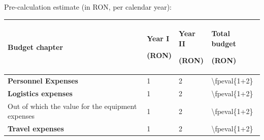 \documentclass[draftproposal,pncdib]{pncdi-pd}
\begin{document}
{
\setlength{\arrayrulewidth}{1pt}

\begin{pncdiexplanation}
Pre-calculation estimate (in RON, per calendar year):
\end{pncdiexplanation}

\edef\EuroRON{5.2429}

\edef\FirstYearPersonnel{1}
\edef\FirstYearLogistics{1}
\edef\FirstYearEquipment{1}
\edef\FirstYearTravel{1}
\edef\FirstYearIndirect{1}

\edef\SecondYearPersonnel{2}
\edef\SecondYearLogistics{2}
\edef\SecondYearEquipment{2}
\edef\SecondYearTravel{2}
\edef\SecondYearIndirect{2}

\edef\TotalPersonnel{\fpeval{\FirstYearPersonnel+\SecondYearPersonnel}}
\edef\TotalLogistics{\fpeval{\FirstYearLogistics+\SecondYearLogistics}}
\edef\TotalEquipment{\fpeval{\FirstYearEquipment+\SecondYearEquipment}}
\edef\TotalTravel{\fpeval{\FirstYearTravel+\SecondYearTravel}}
\edef\TotalIndirect{\fpeval{\FirstYearIndirect+\SecondYearIndirect}}

\noindent \begin{tabular}{
    |m{}
    |m{}
    |m{}
    |m{}|} \hline
\rowcolor{PNCDITableGray}
\centering\textbf{Budget chapter} &
\multicolumn{1}{m{0.1\textwidth}|}{\centering\textbf{Year I}

\textbf{(RON)}} &
\multicolumn{1}{m{0.1\textwidth}|}{\centering\textbf{Year II}

\textbf{(RON)}} &
\multicolumn{1}{m{0.185\textwidth}|}{\centering\textbf{Total budget}

\textbf{(RON)}}
\\\hline

\textbf{Personnel Expenses} &
\num{\FirstYearPersonnel} &
\num{\SecondYearPersonnel} &
\num{\TotalPersonnel}
\\\hline

\textbf{Logistics expenses} &
\num{\FirstYearLogistics} &
\num{\SecondYearLogistics} &
\num{\TotalLogistics}
\\\hline

Out of which the value for the equipment expenses &
\num{\FirstYearEquipment} &
\num{\SecondYearEquipment} &
\num{\TotalEquipment}
\\\hline

\textbf{Travel expenses} &
\num{\FirstYearTravel} &
\num{\SecondYearTravel} &
\num{\TotalTravel}
\\\hline


\end{tabular}}
\end{document}
